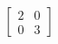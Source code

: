 \documentclass[preview]{standalone}
\begin{document}
\begin{align*}
\begin{bmatrix} 2 & 0\\ 0 & 3 \end{bmatrix}
\end{align*}
\end{document}
